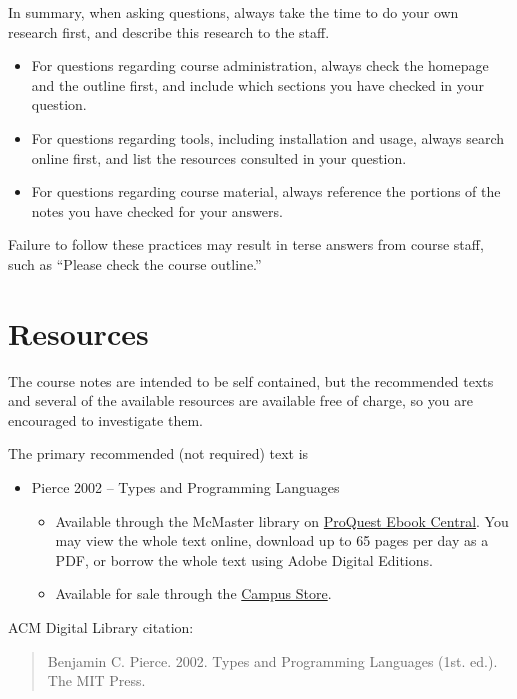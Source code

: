 \documentclass[11pt]{article}
\begin{document}
In summary, when asking questions, always take the time to
do your own research first, and describe this research to the staff.
\begin{itemize}
\item For questions regarding course administration,
always check the homepage and the outline first,
and include which sections you have checked in your question.
\item For questions regarding tools, including installation and usage,
always search online first, and list the resources consulted
in your question.
\item For questions regarding course material, always
reference the portions of the notes you have checked
for your answers.
\end{itemize}

Failure to follow these practices may result in
terse answers from course staff, such as
“Please check the course outline.” 

\section{Resources}
\label{sec:org92e418d}
The course notes are intended to be self contained,
but the recommended texts and several of the available resources
are available free of charge,
so you are encouraged to investigate them.

The primary recommended (not required) text is
\begin{itemize}
\item Pierce 2002 – Types and Programming Languages
\begin{itemize}
\item Available through the McMaster library on
\href{https://ebookcentral.proquest.com/lib/mcmu/detail.action?docID=3338823}{ProQuest Ebook Central}.
You may view the whole text online,
download up to 65 pages per day as a PDF, or
borrow the whole text using Adobe Digital Editions.
\item Available for sale through the
\href{https://campusstore.mcmaster.ca/cgi-mcm/ws/txsub.pl?wsTERMG1=204\&wsDEPTG1=COMPSCI\&wsCOURSEG1=3MI3\&wsSECTIONG1=DAY\%20C01\&crit\_cnt=1}{Campus Store}.
\end{itemize}
\end{itemize}

ACM Digital Library citation:
\begin{quote}
Benjamin C. Pierce. 2002.
Types and Programming Languages (1st. ed.).
The MIT Press.
\end{quote}
\end{document}
